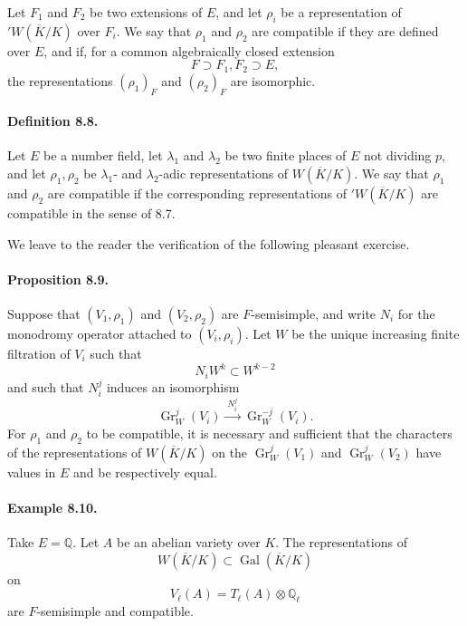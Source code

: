 \documentclass[10pt]{article}
\newcommand{\Q}{\mathbb Q}
\newcommand{\Gal}{\operatorname{Gal}}
\providecommand{\Gal}{\operatorname{Gal}}
\providecommand{\Gr}{\operatorname{Gr}}
\providecommand{\Gal}{\operatorname{Gal}}
\providecommand{\Gal}{\operatorname{Gal}}
\providecommand{\Gal}{\operatorname{Gal}}
\begin{document}
Let \(F_1\) and \(F_2\) be two extensions of \(E\), and let \(\rho_i\) be a representation of \({}'W(\overline K/K)\) over \(F_i\). We say that \(\rho_1\) and \(\rho_2\) are compatible if they are defined over \(E\), and if, for a common algebraically closed extension
\[
F\supset F_1,F_2\supset E,
\]
the representations \((\rho_1)_F\) and \((\rho_2)_F\) are isomorphic.

\paragraph{Definition 8.8.} Let $E$ be a number field, let $\lambda_1$ and $\lambda_2$ be two finite places of $E$ not dividing $p$, and let $\rho_1,\rho_2$ be $\lambda_1$- and $\lambda_2$-adic representations of $W(\overline K/K)$. We say that $\rho_1$ and $\rho_2$ are compatible if the corresponding representations of ${}'W(\overline K/K)$ are compatible in the sense of 8.7.

We leave to the reader the verification of the following pleasant exercise.

\paragraph{Proposition 8.9.} Suppose that $(V_1,\rho_1)$ and $(V_2,\rho_2)$ are $F$-semisimple, and write $N_i$ for the monodromy operator attached to $(V_i,\rho_i)$. Let $W$ be the unique increasing finite filtration of $V_i$ such that
\[
N_i W^k\subset W^{k-2}
\]
and such that $N_i^j$ induces an isomorphism
\[
\Gr_W^j(V_i)\xrightarrow{\;N_i^j\;}\Gr_W^{-j}(V_i).
\]
For $\rho_1$ and $\rho_2$ to be compatible, it is necessary and sufficient that the characters of the representations of $W(\overline K/K)$ on the $\Gr_W^j(V_1)$ and $\Gr_W^j(V_2)$ have values in $E$ and be respectively equal.

\paragraph{Example 8.10.} Take $E=\Q$. Let $A$ be an abelian variety over $K$. The representations of
\[
W(\overline K/K)\subset\Gal(\overline K/K)
\]
on
\[
V_\ell(A)=T_\ell(A)\otimes\Q_\ell
\]
are $F$-semisimple and compatible.
\end{document}
